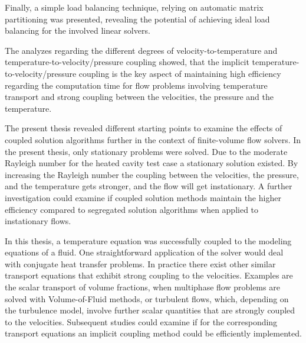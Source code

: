Finally, a simple load balancing technique, relying on automatic matrix partitioning was presented, revealing the potential of achieving ideal load balancing for the involved linear solvers.

The analyzes regarding the different degrees of velocity-to-temperature and temperature-to-velocity/pressure coupling showed, that the implicit temperature-to-velocity/pressure coupling is the key aspect of maintaining high efficiency regarding the computation time for flow problems involving temperature transport and strong coupling between the velocities, the pressure and the temperature.

The present thesis revealed different starting points to examine the effects of coupled solution algorithms further in the context of finite-volume flow solvers. In the present thesis, only stationary problems were solved. Due to the moderate Rayleigh number for the heated cavity test case a stationary solution existed. By increasing the Rayleigh number the coupling between the velocities, the pressure, and the temperature gets stronger, and the flow will get instationary. A further investigation could examine if coupled solution methods maintain the higher efficiency compared to segregated solution algorithms when applied to instationary flows.

In this thesis, a temperature equation was successfully coupled to the modeling equations of a fluid. One straightforward application of the solver would deal with conjugate heat transfer problems. In practice there exist other similar transport equations that exhibit strong coupling to the velocities. Examples are the scalar transport of volume fractions, when multiphase flow problems are solved with Volume-of-Fluid methods, or turbulent flows, which, depending on the turbulence model, involve further scalar quantities that are strongly coupled to the velocities. Subsequent studies could examine if for the corresponding transport equations an implicit coupling method could be efficiently implemented.

